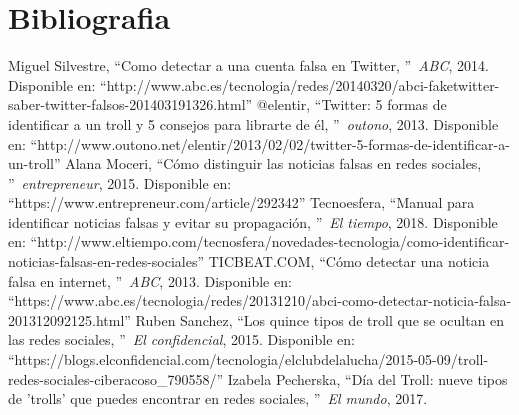 \documentclass[../all.tex]{subfiles}
\begin{document}
\section{Bibliografia}


\begin{thebibliography}{37}
	
		Miguel Silvestre, 
		\textquotedblleft Como detectar a una cuenta falsa en Twitter,
		\textquotedblright\ \textit{ABC},
		2014.
		Disponible en: ``http://www.abc.es/tecnologia/redes/20140320/abci-faketwitter-saber-twitter-falsos-201403191326.html''
		@elentir, 
		\textquotedblleft Twitter: 5 formas de identificar a un troll y 5 consejos para librarte de él,
		\textquotedblright\ \textit{outono},
		2013.
		Disponible en: ``http://www.outono.net/elentir/2013/02/02/twitter-5-formas-de-identificar-a-un-troll''
		Alana Moceri, 
		\textquotedblleft Cómo distinguir las noticias falsas en redes sociales,
		\textquotedblright\ \textit{entrepreneur},
		2015.
		Disponible en: ``https://www.entrepreneur.com/article/292342''
		Tecnoesfera, 
		\textquotedblleft Manual para identificar noticias falsas y evitar su propagación,
		\textquotedblright\ \textit{El tiempo},
		2018.
		Disponible en: ``http://www.eltiempo.com/tecnosfera/novedades-tecnologia/como-identificar-noticias-falsas-en-redes-sociales''
		TICBEAT.COM, 
		\textquotedblleft Cómo detectar una noticia falsa en internet,
		\textquotedblright\ \textit{ABC},
		2013.
		Disponible en: ``https://www.abc.es/tecnologia/redes/20131210/abci-como-detectar-noticia-falsa-201312092125.html''
		Ruben Sanchez, 
		\textquotedblleft Los quince tipos de troll que se ocultan en las redes sociales,
		\textquotedblright\ \textit{El confidencial},
		2015.
		Disponible en: ``https://blogs.elconfidencial.com/tecnologia/elclubdelalucha/2015-05-09/troll-redes-sociales-ciberacoso\_790558/''
		Izabela Pecherska, 
		\textquotedblleft Día del Troll: nueve tipos de 'trolls' que puedes encontrar en redes sociales,
		\textquotedblright\ \textit{El mundo},
		2017.

\end{thebibliography}
\end{document}
